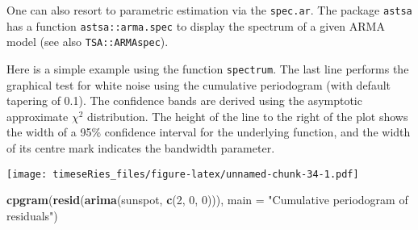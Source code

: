 \documentclass[]{book}
\newenvironment{Shaded}{\begin{snugshade}}{\end{snugshade}}
\newcommand{\CommentTok}[1]{\textcolor[rgb]{0.56,0.35,0.01}{\textit{#1}}}
\newcommand{\DataTypeTok}[1]{\textcolor[rgb]{0.13,0.29,0.53}{#1}}
\newcommand{\DecValTok}[1]{\textcolor[rgb]{0.00,0.00,0.81}{#1}}
\newcommand{\KeywordTok}[1]{\textcolor[rgb]{0.13,0.29,0.53}{\textbf{#1}}}
\newcommand{\NormalTok}[1]{#1}
\newcommand{\OperatorTok}[1]{\textcolor[rgb]{0.81,0.36,0.00}{\textbf{#1}}}
\newcommand{\OtherTok}[1]{\textcolor[rgb]{0.56,0.35,0.01}{#1}}
\newcommand{\StringTok}[1]{\textcolor[rgb]{0.31,0.60,0.02}{#1}}
\begin{document}
One can also resort to parametric estimation via the \texttt{spec.ar}.
The package \texttt{astsa} has a function \texttt{astsa::arma.spec} to
display the spectrum of a given ARMA model (see also
\texttt{TSA::ARMAspec}).

Here is a simple example using the function \texttt{spectrum}. The last
line performs the graphical test for white noise using the cumulative
periodogram (with default tapering of 0.1). The confidence bands are
derived using the asymptotic approximate \(\chi^2\) distribution. The
height of the line to the right of the plot shows the width of a 95\%
confidence interval for the underlying function, and the width of its
centre mark indicates the bandwidth parameter.

\begin{Shaded}
\end{Shaded}

\texttt{[image: timeseRies\_files/figure-latex/unnamed-chunk-34-1.pdf]}

\begin{Shaded}
\begin{Highlighting}[]
\KeywordTok{cpgram}\NormalTok{(}\KeywordTok{resid}\NormalTok{(}\KeywordTok{arima}\NormalTok{(sunspot, }\KeywordTok{c}\NormalTok{(}\DecValTok{2}\NormalTok{, }\DecValTok{0}\NormalTok{, }\DecValTok{0}\NormalTok{))), }\DataTypeTok{main =} \StringTok{"Cumulative periodogram of residuals"}\NormalTok{)}
\end{Highlighting}
\end{Shaded}
\end{document}
